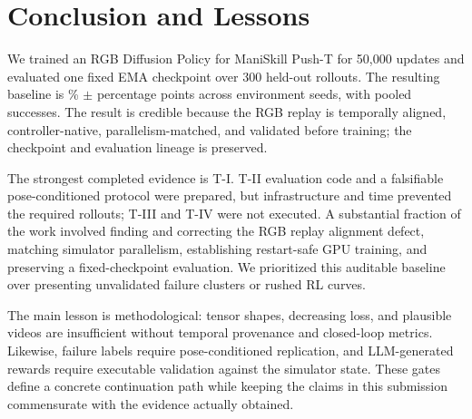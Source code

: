 \section{Conclusion and Lessons}

We trained an RGB Diffusion Policy for ManiSkill Push-T for 50,000 updates and evaluated one fixed
EMA checkpoint over 300 held-out rollouts. The resulting baseline is \timean\% $\pm$ \tistd{}
percentage points across environment seeds, with \tipooled{} pooled successes. The result is
credible because the RGB replay is temporally aligned, controller-native, parallelism-matched, and
validated before training; the checkpoint and evaluation lineage is preserved.

The strongest completed evidence is T-I. T-II evaluation code and a falsifiable pose-conditioned
protocol were prepared, but infrastructure and time prevented the required rollouts; T-III and
T-IV were not executed. A substantial fraction of the work involved finding and correcting the
RGB replay alignment defect, matching simulator parallelism, establishing restart-safe GPU
training, and preserving a fixed-checkpoint evaluation. We prioritized this auditable baseline
over presenting unvalidated failure clusters or rushed RL curves.

The main lesson is methodological: tensor shapes, decreasing loss, and plausible videos are
insufficient without temporal provenance and closed-loop metrics. Likewise, failure labels require
pose-conditioned replication, and LLM-generated rewards require executable validation against the
simulator state. These gates define a concrete continuation path while keeping the claims in this
submission commensurate with the evidence actually obtained.
